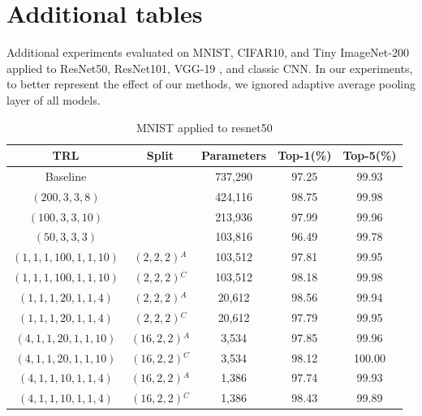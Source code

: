 \documentclass{article}
\begin{document}
\section{Additional tables}
\label{additional-tables}
Additional experiments evaluated on MNIST, CIFAR10, and Tiny ImageNet-200 applied to ResNet50, ResNet101, VGG-19 , and classic CNN. In our experiments, to better represent the effect of our methods, we ignored adaptive average pooling layer of all models. 
\begin{table}
	\caption{MNIST applied to resnet50}
	\label{atab-1}
	\centering
	\begin{tabular}{c c c c c}
		\toprule
		\textbf{TRL} & \textbf{Split} & \textbf{Parameters} & \textbf{Top-1(\%)} & \textbf{Top-5(\%)} \\
		\midrule
		Baseline & & 737,290 & 97.25 & 99.93 \\
		$(200,3,3,8)$ & & 424,116 & 98.75 & 99.98 \\
		$(100,3,3,10)$ & & 213,936 & 97.99 & 99.96 \\
		$(50,3,3,3)$ & & 103,816 & 96.49 & 99.78 \\
		$(1,1,1,100,1,1,10)$ & $(2,2,2)$$^A$ & 103,512 & 97.81 & 99.95 \\
		$(1,1,1,100,1,1,10)$ & $(2,2,2)$$^C$ & 103,512 & 98.18 & 99.98 \\
		$(1,1,1,20,1,1,4)$ & $(2,2,2)$$^A$ & 20,612 & 98.56 & 99.94 \\
		$(1,1,1,20,1,1,4)$ & $(2,2,2)$$^C$ & 20,612 & 97.79 & 99.95 \\
		$(4,1,1,20,1,1,10)$ & $(16,2,2)$$^A$ & 3,534 & 97.85 & 99.96 \\
		$(4,1,1,20,1,1,10)$ & $(16,2,2)$$^C$ & 3,534 & 98.12 & 100.00 \\
		$(4,1,1,10,1,1,4)$ & $(16,2,2)$$^A$ & 1,386 & 97.74 & 99.93 \\
		$(4,1,1,10,1,1,4)$ & $(16,2,2)$$^C$ & 1,386 & 98.43 & 99.89 \\
		\hline
	\end{tabular}
\end{table}
\end{document}
